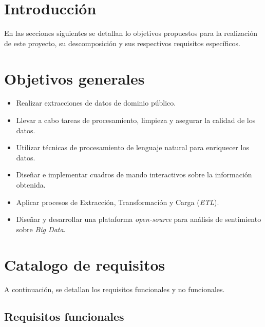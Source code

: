 
\section{Introducción}

En las secciones siguientes se detallan lo objetivos propuestos para la realización de este proyecto, su descomposición y sus respectivos requisitos específicos.

\section{Objetivos generales}

\begin{itemize}
    \item Realizar extracciones de datos de dominio público.

    \item Llevar a cabo tareas de procesamiento, limpieza y asegurar la calidad de los datos.

    \item Utilizar técnicas de procesamiento de lenguaje natural para enriquecer los datos.

    \item Diseñar e implementar cuadros de mando interactivos sobre la información obtenida.

    \item Aplicar procesos de Extracción, Transformación y Carga (\textit{ETL}).

    \item Diseñar y desarrollar una plataforma \textit{open-source} para análisis de sentimiento sobre \textit{Big Data}.
\end{itemize}

\section{Catalogo de requisitos}

A continuación, se detallan los requisitos funcionales y no funcionales.

\subsection{Requisitos funcionales}

